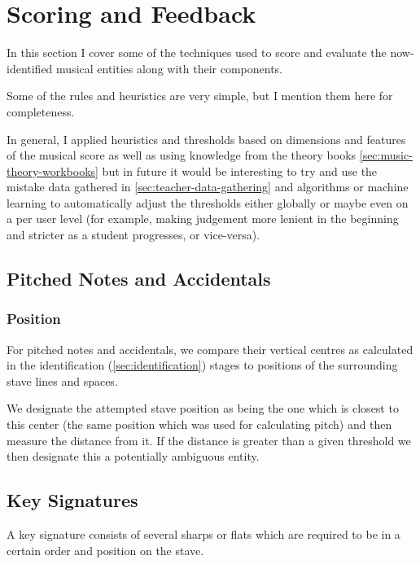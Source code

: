 \section{Scoring and Feedback}\label{sec:scoring}

In this section I cover some of the techniques used to score and evaluate the now-identified musical entities along with their components.

Some of the rules and heuristics are very simple, but I mention them here for completeness.

In general, I applied heuristics and thresholds based on dimensions and features of the musical score as well as using knowledge from the theory books \cref{sec:music-theory-workbooks} but in future it would be interesting to try and use the mistake data gathered in \cref{sec:teacher-data-gathering} and algorithms or machine learning to automatically adjust the thresholds either globally or maybe even on a per user level (for example, making judgement more lenient in the beginning and stricter as a student progresses, or vice-versa).

\subsection{Pitched Notes and Accidentals}
\label{sec:pitched-notes}

\subsubsection{Position}\label{sec:scoring-position}

For pitched notes and accidentals, we compare their vertical centres as calculated in the identification (\cref{sec:identification}) stages to positions of the surrounding stave lines and spaces.

We designate the attempted stave position as being the one which is closest to this center (the same position which was used for calculating pitch) and then measure the distance from it. If the distance is greater than a given threshold we then designate this a potentially ambiguous entity.

\subsection{Key Signatures}

A key signature consists of several sharps or flats which are required to be in a certain order and position on the stave.


